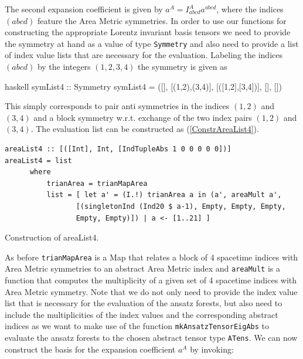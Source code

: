 \documentclass[a4paper,12pt, DIV=14, BCOR=5mm, twoside, headsepline, numbers=noenddot]{scrbook}
\begin{document}
The second expansion coefficient is given by $a^A = I^A_{abcd} a^{abcd}$, where the indices $(abcd)$ feature the Area Metric symmetries. In order to use our functions for constructing the appropriate Lorentz invariant basis tensors we need to provide the symmetry at hand as a value of type \texttt{Symmetry} and also need to provide a list of index value lists that are necessary for the evaluation. Labeling the indices $(abcd)$ by the integers $(1,2,3,4)$ the symmetry is given as 

\begin{center}
\begin{cminted}{haskell}
symList4 :: Symmetry
symList4 = ([], [(1,2),(3,4)], [([1,2],[3,4])], [], [])
\end{cminted}
\end{center}

This simply corresponds to pair anti symmetries in the indices $(1,2)$ and $(3,4)$ and a block symmetry w.r.t. exchange of the two index pairs $(1,2)$ and $(3,4)$. The evaluation list can be constructed as (\ref{ConstrAreaList4}).

\begin{listing}[hbt!]
\begin{verbatim}
areaList4 :: [([Int], Int, [IndTupleAbs 1 0 0 0 0 0])]
areaList4 = list
      where
          trianArea = trianMapArea
          list = [ let a' = (I.!) trianArea a in (a', areaMult a',
                 [(singletonInd (Ind20 $ a-1), Empty, Empty, Empty,
                 Empty, Empty)]) | a <- [1..21] ]
\end{verbatim} 
\caption{Construction of areaList4.}\label{ConstrAreaList4}
\end{listing}

As before \texttt{trianMapArea} is a Map that relates a block of 4 spacetime indices with Area Metric symmetries to an abstract Area Metric index and \texttt{areaMult} is a function that computes the multiplicity of a given set of 4 spacetime indices with Area Metric symmetry. Note that we do not only need to provide the index value list that is necessary for the evaluation of the ansatz forests, but also need to include the multiplicities of the index values and the corresponding abstract indices as we want to make use of the function \texttt{mkAnsatzTensorEigAbs} to evaluate the ansatz forests to the chosen abstract tensor type \texttt{ATens}. We can now construct the basis for the expansion coefficient $a^{A}$ by invoking:
\end{document}
